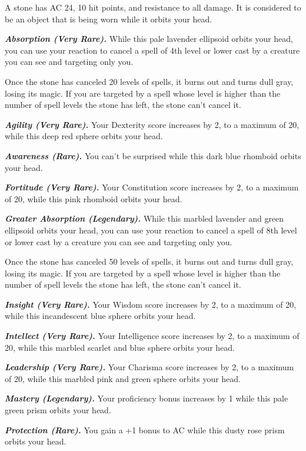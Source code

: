 \documentclass[
]{article}
\begin{document}
A stone has AC 24, 10 hit points, and resistance to all damage. It is
considered to be an object that is being worn while it orbits your head.

\emph{\textbf{Absorption (Very Rare).}} While this pale lavender
ellipsoid orbits your head, you can use your reaction to cancel a spell
of 4th level or lower cast by a creature you can see and targeting only
you.

Once the stone has canceled 20 levels of spells, it burns out and turns
dull gray, losing its magic. If you are targeted by a spell whose level
is higher than the number of spell levels the stone has left, the stone
can't cancel it.

\emph{\textbf{Agility (Very Rare).}} Your Dexterity score increases by
2, to a maximum of 20, while this deep red sphere orbits your head.

\emph{\textbf{Awareness (Rare).}} You can't be surprised while this dark
blue rhomboid orbits your head.

\emph{\textbf{Fortitude (Very Rare).}} Your Constitution score increases
by 2, to a maximum of 20, while this pink rhomboid orbits your head.

\emph{\textbf{Greater Absorption (Legendary).}} While this marbled
lavender and green ellipsoid orbits your head, you can use your reaction
to cancel a spell of 8th level or lower cast by a creature you can see
and targeting only you.

Once the stone has canceled 50 levels of spells, it burns out and turns
dull gray, losing its magic. If you are targeted by a spell whose level
is higher than the number of spell levels the stone has left, the stone
can't cancel it.

\emph{\textbf{Insight (Very Rare).}} Your Wisdom score increases by 2,
to a maximum of 20, while this incandescent blue sphere orbits your
head.

\emph{\textbf{Intellect (Very Rare).}} Your Intelligence score increases
by 2, to a maximum of 20, while this marbled scarlet and blue sphere
orbits your head.

\emph{\textbf{Leadership (Very Rare).}} Your Charisma score increases by
2, to a maximum of 20, while this marbled pink and green sphere orbits
your head.

\emph{\textbf{Mastery (Legendary).}} Your proficiency bonus increases by
1 while this pale green prism orbits your head.

\emph{\textbf{Protection (Rare).}} You gain a +1 bonus to AC while this
dusty rose prism orbits your head.
\end{document}

